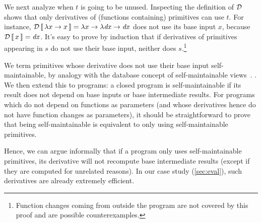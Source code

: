 \begin{oldSec} %
We next analyze when $t$ is going to be unused.
Inspecting the definition of $\mathcal{D}$ shows that only derivatives of (functions
containing) primitives can use $t$. For instance,
$\Derive{\Lam{x}{x}} = \Lam{x}{\Lam{\D x}{\D x}}$ does not use its
base input $x$, because $\Derive{x} = \D x$.
It's easy to prove
by induction that if derivatives of primitives appearing in $s$
do not use their base input, neither does $s$.\footnote{Function
  changes coming from outside the program are not covered by this
  proof and are possible counterexamples.}

We term primitives whose derivative does not use their base input
self-maintainable, by analogy with the database concept of
self-maintainable views~\citep{Gupta99MMV}. . 
We then extend this to programs: a
closed program is self-maintainable if its result does not depend
on base inputs or base intermediate results.
%
For programs which do not depend on functions as parameters (and
whose derivatives hence do not have function changes as
parameters), it should be straightforward to prove that being
self-maintainable is equivalent to only using self-maintainable
primitives.

Hence, we can argue informally that if a program only uses
self-maintainable primitives, its derivative will not recompute
base intermediate results (except if they are computed for
unrelated reasons). In our case study (\cref{sec:eval}),
such derivatives are already
extremely efficient.

\end{oldSec}
